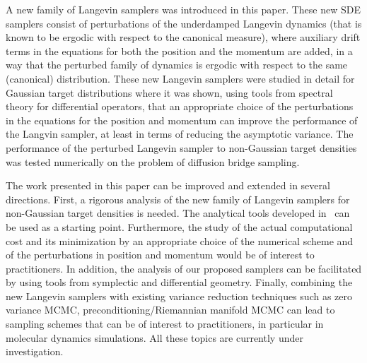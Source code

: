 
A new family of Langevin samplers was introduced in this paper. These new SDE samplers consist of perturbations of the underdamped Langevin dynamics (that is known to be ergodic with respect to the canonical measure), where auxiliary drift terms in the equations for both the position and the momentum are added, in a way that the perturbed family of dynamics is ergodic with respect to the same (canonical) distribution. These new Langevin samplers were studied in detail for Gaussian target distributions where it was shown, using tools from spectral theory for differential operators, that an appropriate choice of the perturbations in the equations for the position and momentum can improve the performance of the Langvin sampler, at least in terms of reducing the asymptotic variance. The performance of the perturbed Langevin sampler to non-Gaussian target densities was tested numerically on the problem of diffusion bridge sampling.

The work presented in this paper can be improved and extended in several directions. First, a rigorous analysis of the new family of Langevin samplers for non-Gaussian target densities is needed. The analytical tools developed in~\cite{duncan2016variance} can be used as a starting point. Furthermore, the study of the actual computational cost and its minimization by an appropriate choice of the numerical scheme and of the perturbations in position and momentum would be of interest to practitioners. In addition, the analysis of our proposed samplers can be facilitated by using tools from symplectic and differential geometry. Finally, combining the new Langevin samplers with existing variance reduction techniques such as zero variance MCMC, preconditioning/Riemannian manifold MCMC can lead to sampling schemes that can be of interest to practitioners, in particular in molecular dynamics simulations. All these topics are currently under investigation.


